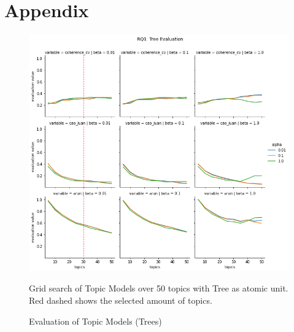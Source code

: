 \documentclass{article}
\begin{document}
    \section{Appendix}
    \begin{figure}[H]
        \begin{centering}
        \includegraphics[scale=0.4]{../Figure/H1_tree_red.png}
        \caption{Evaluation of Topic Models (Trees)}
        \end{centering}
        \begin{footnotesize} 
            Grid search of Topic Models over 50 topics with Tree as atomic unit. Red dashed shows the selected amount of topics.         \end{footnotesize}
    \end{figure}
\end{document}
